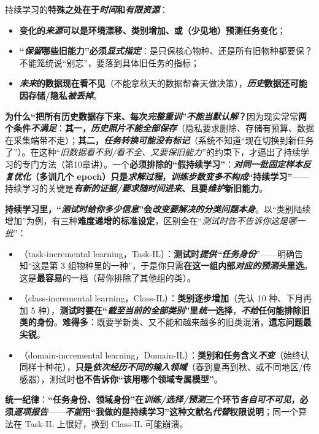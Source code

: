 持续学习的\textbf{特殊之处在于\emph{时间}和\emph{有限资源}}：
\begin{itemize}\item \textbf{变化的\emph{来源}可以是环境漂移、类别增加、或（少见地）预测任务变化}；\item \textbf{“\emph{保留}哪些旧能力”必须\emph{显式指定}}：是只保核心物种、还是所有旧物种都要保？不能笼统说“别忘”，要落到具体旧任务的指标；\item \textbf{\emph{未来}的数据现在看不见}（不能拿秋天的数据帮春天做决策），\textbf{\emph{历史}数据还可能因存储/隐私\emph{被丢掉}}。\end{itemize}
\textbf{为什么“把所有历史数据存下来、每次\emph{完整重训}”\emph{不能当默认解}？}因为现实常常\textbf{两个条件\emph{不满足}}：\textbf{其一，\emph{历史照片\emph{不能全部保存}}}（隐私要求删除、存储有预算、数据在采集端带不走）；\textbf{其二，\emph{任务转换可能\emph{没有标记}}}（系统不知道“现在切换到新任务了”）。在这种“\emph{旧数据看不到/看不全、又要保旧能力}”的约束下，才逼出了持续学习的专门方法（第10章讲）。一个\textbf{必须排除的“假持续学习”}：\textbf{\emph{对同一批固定样本反复优化}（多训几个 epoch）只是\emph{求解过程}，\emph{训练步数变多}\emph{不构成}“持续学习”}——持续学习的关键是\textbf{\emph{有新的证据/要求\emph{随时间}进来}、且要\emph{维护}新旧能力}。

\textbf{持续学习里，“\emph{测试时给你多少信息}”会\emph{改变要解决的分类问题本身}}。以“类别陆续增加”为例，有三种\textbf{难度递增的标准设定}，区别全在“\emph{测试时\emph{告不告诉你}这是哪一批}”：
\begin{itemize}\item {}（task-incremental learning，Task-IL）：\textbf{测试时\emph{提供“任务身份}}”——明确告知“这是第 3 组物种里的一种”，于是你只需\textbf{在这一组内部\emph{对应的预测头}里选}。这是\textbf{最容易}的一档（帮你排除了其他组的类）。\item {}（class-incremental learning，Class-IL）：\textbf{类别逐步增加}（先认 10 种、下月再加 5 种），\textbf{测试时要在“\emph{截至当前的\emph{全部类别}}”里\emph{统一}选择}，\textbf{\emph{不给}任何能排除旧类的身份}。\textbf{难得多}：既要学新类、又不能和越来越多的旧类混淆，\textbf{遗忘问题最尖锐}。\item {}（domain-incremental learning，Domain-IL）：\textbf{类别和任务含义\emph{不变}}（始终认同样十种花），\textbf{只是\emph{依次经历不同的输入领域}}（春到夏再到秋、或不同地区/传感器），测试时\textbf{也不告诉你“该用哪个领域专属模型”}。\end{itemize}
\textbf{统一纪律}：\textbf{“任务身份、领域身份”在\emph{训练/选择/预测}三个环节\emph{各自可不可见}，必须\emph{逐项报告}}——\textbf{\emph{不能}用“我做的是持续学习”这种文献名\emph{代替}权限说明}；同一个算法在 Task-IL 上很好，换到 Class-IL 可能崩溃。


